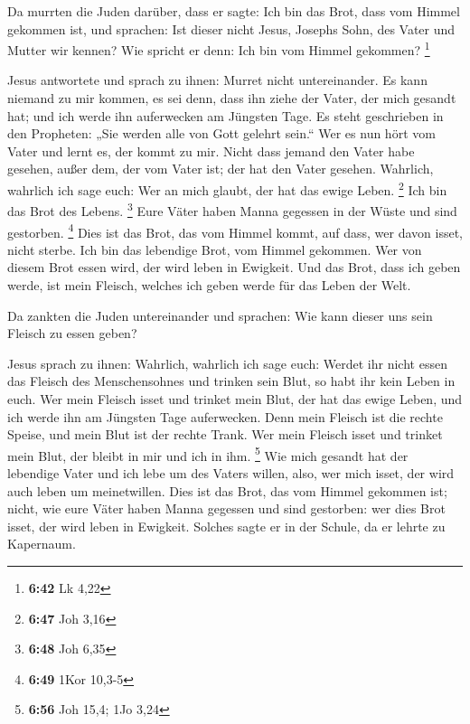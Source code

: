  Da murrten die Juden darüber, dass er sagte: Ich bin das
Brot, dass vom Himmel gekommen ist,  und sprachen: Ist
dieser nicht Jesus, Josephs Sohn, des Vater und Mutter wir kennen? Wie
spricht er denn: Ich bin vom Himmel gekommen? \footnote{\textbf{6:42} Lk
  4,22}

 Jesus antwortete und sprach zu ihnen: Murret nicht
untereinander.  Es kann niemand zu mir kommen, es sei denn,
dass ihn ziehe der Vater, der mich gesandt hat; und ich werde ihn
auferwecken am Jüngsten Tage.  Es steht geschrieben in den
Propheten: „Sie werden alle von Gott gelehrt sein.`` Wer es nun hört vom
Vater und lernt es, der kommt zu mir.  Nicht dass jemand
den Vater habe gesehen, außer dem, der vom Vater ist; der hat den Vater
gesehen.  Wahrlich, wahrlich ich sage euch: Wer an mich
glaubt, der hat das ewige Leben. \footnote{\textbf{6:47} Joh 3,16}
 Ich bin das Brot des Lebens. \footnote{\textbf{6:48} Joh
  6,35}  Eure Väter haben Manna gegessen in der Wüste und
sind gestorben. \footnote{\textbf{6:49} 1Kor 10,3-5}  Dies
ist das Brot, das vom Himmel kommt, auf dass, wer davon isset, nicht
sterbe.  Ich bin das lebendige Brot, vom Himmel gekommen.
Wer von diesem Brot essen wird, der wird leben in Ewigkeit. Und das
Brot, dass ich geben werde, ist mein Fleisch, welches ich geben werde
für das Leben der Welt.

 Da zankten die Juden untereinander und sprachen: Wie kann
dieser uns sein Fleisch zu essen geben?

 Jesus sprach zu ihnen: Wahrlich, wahrlich ich sage euch:
Werdet ihr nicht essen das Fleisch des Menschensohnes und trinken sein
Blut, so habt ihr kein Leben in euch.  Wer mein Fleisch
isset und trinket mein Blut, der hat das ewige Leben, und ich werde ihn
am Jüngsten Tage auferwecken.  Denn mein Fleisch ist die
rechte Speise, und mein Blut ist der rechte Trank.  Wer
mein Fleisch isset und trinket mein Blut, der bleibt in mir und ich in
ihm. \footnote{\textbf{6:56} Joh 15,4; 1Jo 3,24}  Wie mich
gesandt hat der lebendige Vater und ich lebe um des Vaters willen, also,
wer mich isset, der wird auch leben um meinetwillen.  Dies
ist das Brot, das vom Himmel gekommen ist; nicht, wie eure Väter haben
Manna gegessen und sind gestorben: wer dies Brot isset, der wird leben
in Ewigkeit.  Solches sagte er in der Schule, da er lehrte
zu Kapernaum.

